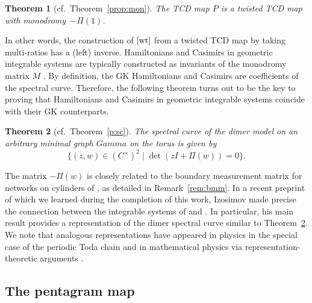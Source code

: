 \documentclass[10pt,a4paper]{amsart}
\numberwithin{equation}{section}
\newtheorem{Theorem}{Theorem}[section]
\newcommand{\C}{{\mathbb C}}
\newcommand{\wt}{{\rm wt}}
\def\Gamma{Gamma}
\def\C{C}
\begin{document}
	\begin{Theorem}[cf.\ Theorem~\ref{prop:mon}]
		The TCD map $P$ is a twisted TCD map with monodro\-my~$-\Pi(1)$.	
	\end{Theorem}
	In other words, the construction of $[\wt]$ from a twisted TCD map by taking multi-ratios has a (left) inverse. Hamiltonians and Casimirs in geometric integrable systems are typically constructed as invariants of the monodromy matrix $M$ \cite{GSTV, KhesinSoloviev, OST1, Soloviev}. By definition, the GK Hamiltonians and Casimirs are coefficients of the spectral curve. Therefore, the following theorem turns out to be the key to proving that Hamiltonians and Casimirs in geometric integrable systems coincide with their GK counterparts.
	\begin{Theorem}[cf.\ Theorem~\ref{p:sc}]
		\label{thm:spectralbm}
		The spectral curve of the dimer model on an arbitrary minimal graph $\Gamma$ on the torus is given by
		\[
		\bigl\{(z,w)\in(\C^\times)^2 \mid \det (zI+\Pi(w))=0\bigr\}.
		\]
	\end{Theorem}
	The matrix $-\Pi(w)$ is closely related to the boundary measurement matrix for networks on cylinders of \cite{GSTV, GSV}, as detailed in Remark~\ref{rem:bmm}. In a recent preprint of which we learned during the completion of this work, Izosimov \cite{Izosimov1} made precise the connection between the integrable systems of \cite{GK13} and \cite{GSTV}. In particular, his main result provides a representation of the dimer spectral curve similar to Theorem~\ref{thm:spectralbm}. We note that analogous representations have appeared in physics in the special case of the periodic Toda chain \cite{EFS} and in mathematical physics via representation-theoretic arguments \cite{FM16}.
	
	
	\subsection{The pentagram map}
	
\end{document}
